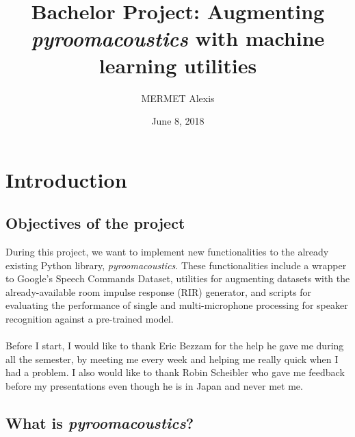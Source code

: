 \documentclass[11pt,a4paper,titlepage]{report}
\author{MERMET Alexis}
\title{Bachelor Project: Augmenting \textit{pyroomacoustics} with machine learning utilities}
\date{June 8, 2018}
\begin{document}
\maketitle
\tableofcontents
\newpage
\chapter{Introduction}
\section{Objectives of the project}
\hspace*{0.6cm}
During this project, we want to implement new functionalities to the already existing Python library, \textit{pyroomacoustics}\cite{pyroom}. These functionalities include a wrapper to Google's Speech Commands Dataset\cite{googlespeech}, utilities for augmenting  datasets with the already-available room impulse response (RIR) generator, and scripts for evaluating the performance of single and multi-microphone processing for speaker recognition against a pre-trained model.\\
\\
\hspace*{0.6cm}
Before I start, I would like to thank Eric Bezzam for the help he gave me during all the semester, by meeting me every week and helping me really quick when I had a problem.
I also would like to thank Robin Scheibler who gave me feedback before my presentations even though he is in Japan and never met me.


\section{What is \textit{pyroomacoustics}?}
\end{document}
